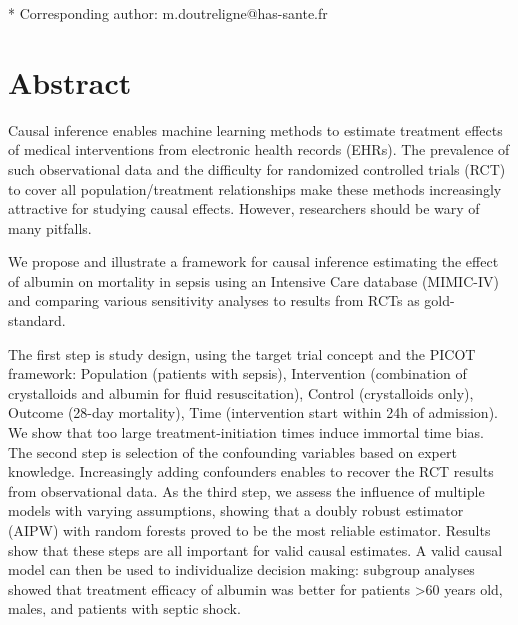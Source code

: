 \documentclass[10pt,letterpaper]{article}
\providecommand{\DIFdelbegin}{} %
\providecommand{\DIFdelend}{} %
\newcommand{\DIFscaledelfig}{0.5}
\newlength{\DIFdelgraphicswidth} %
\newlength{\DIFdelgraphicsheight} %
\newcommand{\DIFdelincludegraphics}[2][]{%
\sbox{\DIFdelgraphicsbox}{\DIFOincludegraphics[#1]{#2}}%
\settoboxwidth{\DIFdelgraphicswidth}{\DIFdelgraphicsbox} %
\settoboxtotalheight{\DIFdelgraphicsheight}{\DIFdelgraphicsbox} %
\scalebox{\DIFscaledelfig}{%
\parbox[b]{\DIFdelgraphicswidth}{\usebox{\DIFdelgraphicsbox}\\[-\baselineskip] \rule{\DIFdelgraphicswidth}{0em}}\llap{\resizebox{\DIFdelgraphicswidth}{\DIFdelgraphicsheight}{%
\setlength{\unitlength}{\DIFdelgraphicswidth}%
\begin{picture}(1,1)%
\thicklines\linethickness{2pt} %
{\color[rgb]{1,0,0}\put(0,0){\framebox(1,1){}}}%
{\color[rgb]{1,0,0}\put(0,0){\line( 1,1){1}}}%
{\color[rgb]{1,0,0}\put(0,1){\line(1,-1){1}}}%
\end{picture}%
}\hspace*{3pt}}} %
} %
\DeclareRobustCommand{\DIFdelbegin}{\DIFOdelbegin \let\includegraphics\DIFdelincludegraphics} %
\DeclareRobustCommand{\DIFdelend}{\DIFOaddend \let\includegraphics\DIFOincludegraphics} %
\begin{document}
\begin{flushleft}



  * Corresponding author: m.doutreligne@has-sante.fr


\end{flushleft}
\section*{Abstract}

Causal inference enables machine learning methods to estimate treatment effects of medical interventions from electronic health records (EHRs). The prevalence of such observational data and the difficulty for randomized controlled trials (RCT) to cover all population/treatment relationships make these methods increasingly attractive for studying causal effects. However, researchers should be wary of many pitfalls. \DIFdelbegin %

\DIFdelend We propose and illustrate a framework for causal inference estimating the effect of albumin on mortality in sepsis using an Intensive Care database (MIMIC-IV) and comparing various sensitivity analyses to results from RCTs as gold-standard. \DIFdelbegin %

\DIFdelend The first step is study design, using the target trial concept and the PICOT framework: Population (patients with sepsis), Intervention (combination of crystalloids and albumin for fluid resuscitation), Control (crystalloids only), Outcome (28-day mortality), Time (intervention start within 24h of admission). We show that too large treatment-initiation times induce immortal time bias. The second step is selection of the confounding variables based on expert knowledge. Increasingly adding confounders enables to recover the RCT results from observational data. As the third step, we assess the influence of multiple models with varying assumptions, showing that a doubly robust estimator (AIPW) with random forests proved to be the most reliable estimator. Results show that these steps are all important for valid causal estimates. A valid causal model can then be used to individualize decision making: subgroup analyses showed that treatment efficacy of albumin was better for patients >60 years old, males, and patients with septic shock. \DIFdelbegin %
\end{document}
